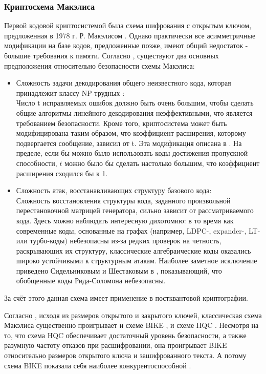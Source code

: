 \subsubsection{Криптосхема Макэлиса}
Первой кодовой криптосистемой была схема шифрования с открытым ключом, предложенная в 1978 г. Р. Макэлисом \cite{me}. Однако практически все асимметричные модификации на базе кодов, предложенные позже, имеют общий недостаток - большие требования к памяти. Согласно \cite{sidelnikov}, существуют два основных предположения относительно безопасности схемы Макэлиса:
\begin{itemize}
    \item Сложность задачи декодирования общего неизвестного кода, которая принадлежит классу NP-трудных \cite{onthe}:\\
    Число t исправляемых ошибок должно быть очень большим, чтобы сделать общие алгоритмы линейного декодирования неэффективными, что является требованием безопасности. Кроме того, криптосистема  может быть модифицирована таким образом, что коэффициент расширения, которому подвергается сообщение, зависил от t. Эта модификация описана в \cite{modif1986}. На пределе, если бы можно было использовать коды достижения пропускной способности, $t$ можно было бы сделать настолько большим, что коэффициент расширения сходился бы к 1.
    \item Сложность атак, восстанавливающих структуру базового кода:\\
   Сложность восстановления структуры кода, заданного произвольной перестановочной матрицей генератора, сильно зависит от рассматриваемого кода. Здесь можно наблюдать интересную дихотомию: в то время как современные коды, основанные на графах (например, LDPC-, expander-, LT- или турбо-коды) небезопасны из-за редких проверок на четность, раскрывающих их структуру, классические алгебраические коды оказались широко устойчивыми к структурным атакам. Наиболее заметное исключение приведено Сидельниковым и Шестаковым в \cite{shest1992}, показывающий, что обобщенные коды Рида-Соломона небезопасны.
\end{itemize}
За счёт этого данная схема имеет применение в постквантовой криптографии.

Согласно \cite{NIST_3-rd}, исходя из размеров открытого и закрытого ключей, классическая схема Макэлиса существенно проигрывает и схеме BIKE \cite{newvariants}, и схеме HQC \cite{effenc}. Несмотря на то, что схема HQC обеспечивает достаточный уровень безопасности, а также разумную частоту отказов при расшифровании, она проигрывает BIKE относительно размеров открытого ключа и зашифрованного текста. А потому схема BIKE показала себя наиболее конкурентоспособной \cite{NIST_3-rd}.